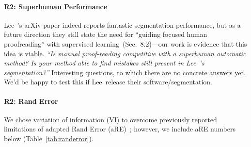 \documentclass[10pt,twocolumn,letterpaper]{article}
\begin{document}
\paragraph{R2: Superhuman Performance} Lee~\etal's arXiv paper indeed reports fantastic segmentation performance, but as a future direction they still state the need for ``guiding focused human proofreading'' with supervised learning~(Sec.~8.2)---our work is evidence that this idea is viable. \newline \noindent \emph{``Is manual proof-reading competitive with a superhuman automatic method? Is your method able to find mistakes still present in Lee~\etal's segmentation?''} Interesting questions, to which there are no concrete answers yet. We'd be happy to test this if Lee~\etal release their software/segmentation. 



\paragraph{R2: Rand Error} We chose variation of information (VI) to overcome previously reported limitations of adapted Rand Error (aRE)~\cite[p.~5]{NunezIglesias2013Machine}; however, we include aRE numbers below (Table~\ref{tab:randerror}).
\end{document}
